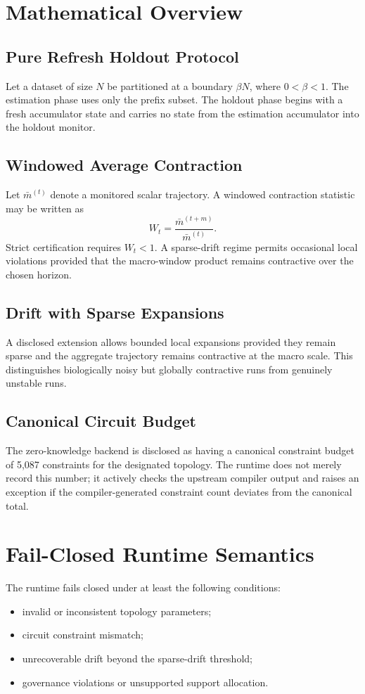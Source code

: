 \documentclass[11pt]{article}
\begin{document}
\section{Mathematical Overview}

\subsection{Pure Refresh Holdout Protocol}
Let a dataset of size \(N\) be partitioned at a boundary \(\beta N\), where \(0 < \beta < 1\). The estimation phase uses only the prefix subset. The holdout phase begins with a fresh accumulator state and carries no state from the estimation accumulator into the holdout monitor.

\subsection{Windowed Average Contraction}
Let \(\bar{m}^{(t)}\) denote a monitored scalar trajectory. A windowed contraction statistic may be written as
\[
W_t = \frac{\bar{m}^{(t+m)}}{\bar{m}^{(t)}}.
\]
Strict certification requires \(W_t < 1\). A sparse-drift regime permits occasional local violations provided that the macro-window product remains contractive over the chosen horizon.

\subsection{Drift with Sparse Expansions}
A disclosed extension allows bounded local expansions provided they remain sparse and the aggregate trajectory remains contractive at the macro scale. This distinguishes biologically noisy but globally contractive runs from genuinely unstable runs.

\subsection{Canonical Circuit Budget}
The zero-knowledge backend is disclosed as having a canonical constraint budget of 5,087 constraints for the designated topology. The runtime does not merely record this number; it actively checks the upstream compiler output and raises an exception if the compiler-generated constraint count deviates from the canonical total.

\section{Fail-Closed Runtime Semantics}
The runtime fails closed under at least the following conditions:
\begin{itemize}
    \item invalid or inconsistent topology parameters;
    \item circuit constraint mismatch;
    \item unrecoverable drift beyond the sparse-drift threshold;
    \item governance violations or unsupported support allocation.
\end{itemize}
\end{document}
